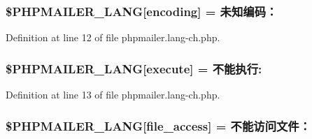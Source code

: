 \subsubsection[{\texorpdfstring{\$\+P\+H\+P\+M\+A\+I\+L\+E\+R\+\_\+\+L\+A\+NG}{$PHPMAILER_LANG}}]{\setlength{\rightskip}{0pt plus 5cm}\$P\+H\+P\+M\+A\+I\+L\+E\+R\+\_\+\+L\+A\+NG\mbox{[}\textquotesingle{}encoding\textquotesingle{}\mbox{]} = \textquotesingle{}未知编码：\textquotesingle{}}\hypertarget{phpmailer_8lang-ch_8php_a817f7283f3d54c970a0c10305cc668cc}{}\label{phpmailer_8lang-ch_8php_a817f7283f3d54c970a0c10305cc668cc}


Definition at line 12 of file phpmailer.\+lang-\/ch.\+php.

\subsubsection[{\texorpdfstring{\$\+P\+H\+P\+M\+A\+I\+L\+E\+R\+\_\+\+L\+A\+NG}{$PHPMAILER_LANG}}]{\setlength{\rightskip}{0pt plus 5cm}\$P\+H\+P\+M\+A\+I\+L\+E\+R\+\_\+\+L\+A\+NG\mbox{[}\textquotesingle{}execute\textquotesingle{}\mbox{]} = \textquotesingle{}不能执行\+: \textquotesingle{}}\hypertarget{phpmailer_8lang-ch_8php_a668217a9563a168f30f2a8548b6ed5a9}{}\label{phpmailer_8lang-ch_8php_a668217a9563a168f30f2a8548b6ed5a9}


Definition at line 13 of file phpmailer.\+lang-\/ch.\+php.

\subsubsection[{\texorpdfstring{\$\+P\+H\+P\+M\+A\+I\+L\+E\+R\+\_\+\+L\+A\+NG}{$PHPMAILER_LANG}}]{\setlength{\rightskip}{0pt plus 5cm}\$P\+H\+P\+M\+A\+I\+L\+E\+R\+\_\+\+L\+A\+NG\mbox{[}\textquotesingle{}file\+\_\+access\textquotesingle{}\mbox{]} = \textquotesingle{}不能访问文件：\textquotesingle{}}\hypertarget{phpmailer_8lang-ch_8php_a7e83349023b856ef9e5c46e30ae6d51e}{}\label{phpmailer_8lang-ch_8php_a7e83349023b856ef9e5c46e30ae6d51e}


